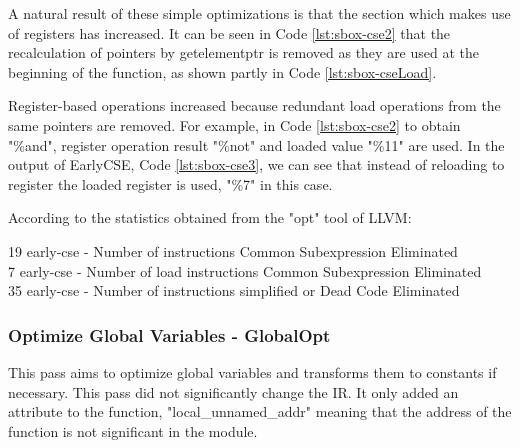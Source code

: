 A natural result of these simple optimizations is that the section which makes use of registers has increased. It can be seen in Code \ref{lst:sbox-cse2} that the recalculation of pointers by getelementptr is removed as they are used at the beginning of the function, as shown partly in Code \ref{lst:sbox-cseLoad}.

\begin{minipage}{\linewidth}

\end{minipage}

 

Register-based operations increased because redundant load operations from the same pointers are removed. For example, in Code \ref{lst:sbox-cse2} to obtain "\%and", register operation result "\%not" and loaded value "\%11" are used. In the output of EarlyCSE, Code \ref{lst:sbox-cse3}, we can see that instead of reloading to register the loaded register is used, "\%7" in this case.

According to the statistics obtained from the "opt" tool of LLVM:
\begin{displayquote}
19 early-cse - Number of instructions Common Subexpression Eliminated \\
 7 early-cse - Number of load instructions Common Subexpression Eliminated \\
35 early-cse - Number of instructions simplified or Dead Code Eliminated \\
\end{displayquote}


\subsubsection{Optimize Global Variables - GlobalOpt}
This pass aims to optimize global variables and transforms them to constants if necessary. This pass did not significantly change the IR. It only added an attribute to the function, "local\_unnamed\_addr" meaning that the address of the function is not significant in the module.



